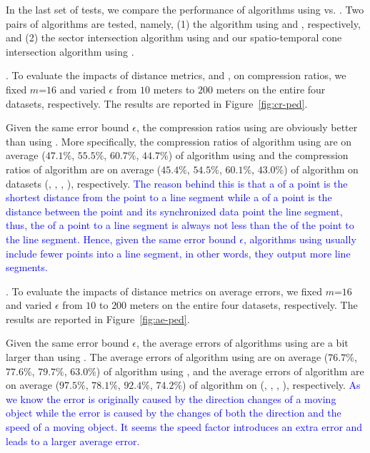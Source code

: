 {In the last set of tests, we compare the performance of algorithms using \ped vs. \sed. Two pairs of algorithms are tested, namely, (1) the algorithm \dpa using \ped and \sed, respectively, and (2) the sector intersection  algorithm \cite{Williams:Longest, Sklansky:Cone} using \ped and our spatio-temporal cone intersection algorithm using \sed.

.
To evaluate the impacts of distance metrics, \ie \ped and \sed, on compression ratios, we fixed {$m$=$16$} and varied $\epsilon$ from $10$ meters to $200$ meters on the entire four datasets, respectively.
The results are reported in Figure~\ref{fig:cr-ped}.


Given the same error bound $\epsilon$, the compression ratios using \ped are obviously better
than using \sed.
More specifically, the compression ratios of algorithm \dpa
using \ped are on average ($47.1\%$, $55.5\%$, $60.7\%$, $44.7\%$) of algorithm \dpa using \sed and
the compression ratios of algorithm \cist are on average
($45.4\%$, $54.5\%$, $60.1\%$, $43.0\%$) of algorithm  on datasets (\sercar, \geolife, \mopsi, \pricar), respectively.
\textcolor{blue}{
The reason behind this is that a \ped of a point is the shortest
distance from the point to a line segment while a \sed of a point is the distance between the point and its synchronized data point \wrt the line segment, thus, the \sed of a point to a line segment is always not less than the \ped of the point to the line segment. Hence, given the same error bound $\epsilon$, \lsa algorithms using \sed usually include fewer points into a line segment, in other words, they output more line segments.}

.
To evaluate the impacts of distance metrics on average errors, we fixed {$m$=$16$} and varied $\epsilon$ from $10$ to $200$ meters on the entire four datasets, respectively.
The results are reported in Figure~\ref{fig:ae-ped}.


Given the same error bound $\epsilon$, the average errors of algorithms using \sed are a bit larger than using \ped.
The average errors of algorithm \dpa using \ped are on average
($76.7\%$, $77.6\%$, $79.7\%$, $63.0\%$) of algorithm \dpa  using \sed, and  the average
errors of algorithm   are on average
($97.5\%$, $78.1\%$, $92.4\%$, $74.2\%$) of algorithm \cist on (\sercar, \geolife, \mopsi, \pricar), respectively.
\textcolor{blue}{As we know the \ped error is originally caused by the direction changes of a moving object while the
\sed error is caused by the changes of both the direction and the speed of a moving object. It seems the speed factor introduces an extra error and leads to a larger average error. }


}
